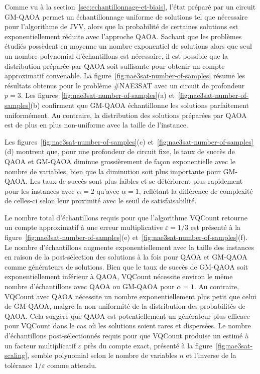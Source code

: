 Comme vu à la section~\ref{sec:echantillonnage-et-biais}, l'état préparé par un circuit GM-QAOA permet un échantillonnage uniforme de solutions tel que nécessaire pour l'algorithme de JVV, alors que la probabilité de certaines solutions est exponentiellement réduite avec l'approche QAOA. Sachant que les problèmes étudiés possèdent en moyenne un nombre exponentiel de solutions alors que seul un nombre polynomial d'échantillons est nécessaire, il est possible que la distribution préparée par QAOA soit suffisante pour obtenir un compte approximatif convenable. La figure~\ref{fig:nae3sat-number-of-samples} résume les résultats obtenus pour le problème \#NAE3SAT avec un circuit de profondeur $p=3$. Les figures~\ref{fig:nae3sat-number-of-samples}(a) et~\ref{fig:nae3sat-number-of-samples}(b) confirment que GM-QAOA échantillonne les solutions parfaitement uniformément. Au contraire, la distribution des solutions préparées par QAOA est de plus en plus non-uniforme avec la taille de l'instance. 

Les figures~\ref{fig:nae3sat-number-of-samples}(c) et~\ref{fig:nae3sat-number-of-samples}(d) montrent que, pour une profondeur de circuit fixe, le taux de succès de QAOA et GM-QAOA diminue grossièrement de façon exponentielle avec le nombre de variables, bien que la diminution soit plus importante pour GM-QAOA. Les taux de succès sont plus faibles et se détériorent plus rapidement pour les instances avec $\alpha = 2$ qu'avec $\alpha=1$, reflétant la différence de complexité de celles-ci selon leur proximité avec le seuil de satisfaisabilité. 

Le nombre total d'échantillons requis pour que l'algorithme VQCount retourne un compte approximatif à une erreur multiplicative $\varepsilon = 1/3$ est présenté à la figure~\ref{fig:nae3sat-number-of-samples}(e) et~\ref{fig:nae3sat-number-of-samples}(f). Le nombre d'échantillons augmente exponentiellement avec la taille des instances en raison de la post-sélection des solutions à la fois pour QAOA et GM-QAOA comme générateurs de solutions. Bien que le taux de succès de GM-QAOA soit exponentiellement inférieur à QAOA, VQCount nécessite environ le même nombre d'échantillons avec QAOA ou GM-QAOA pour $\alpha=1$. Au contraire, VQCount avec QAOA nécessite un nombre exponentiellement plus petit que celui de GM-QAOA, malgré la non-uniformité de la distribution des probabilités de QAOA. Cela suggère que QAOA est potentiellement un générateur plus efficace pour VQCount dans le cas où les solutions soient rares et dispersées. Le nombre d'échantillons post-sélectionnés requis pour que VQCount produise un estimé à un facteur multiplicatif $\varepsilon$ près du compte exact, présenté à la figure~\ref{fig:nae3sat-scaling}, semble polynomial selon le nombre de variables $n$ et l'inverse de la tolérance $1/\varepsilon$ comme attendu.

